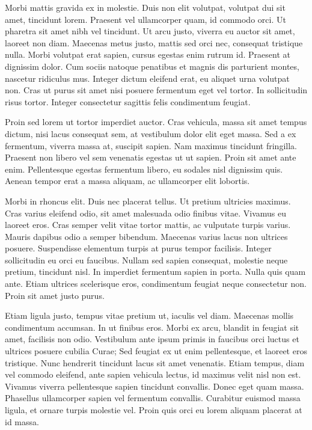 \documentclass[runningheads,a4paper]{llncs}
\begin{document}
Morbi mattis gravida ex in molestie. Duis non elit volutpat, volutpat dui sit amet, tincidunt lorem. Praesent vel ullamcorper quam, id commodo orci. Ut pharetra sit amet nibh vel tincidunt. Ut arcu justo, viverra eu auctor sit amet, laoreet non diam. Maecenas metus justo, mattis sed orci nec, consequat tristique nulla. Morbi volutpat erat sapien, cursus egestas enim rutrum id. Praesent at dignissim dolor. Cum sociis natoque penatibus et magnis dis parturient montes, nascetur ridiculus mus. Integer dictum eleifend erat, eu aliquet urna volutpat non. Cras ut purus sit amet nisi posuere fermentum eget vel tortor. In sollicitudin risus tortor. Integer consectetur sagittis felis condimentum feugiat.

Proin sed lorem ut tortor imperdiet auctor. Cras vehicula, massa sit amet tempus dictum, nisi lacus consequat sem, at vestibulum dolor elit eget massa. Sed a ex fermentum, viverra massa at, suscipit sapien. Nam maximus tincidunt fringilla. Praesent non libero vel sem venenatis egestas ut ut sapien. Proin sit amet ante enim. Pellentesque egestas fermentum libero, eu sodales nisl dignissim quis. Aenean tempor erat a massa aliquam, ac ullamcorper elit lobortis.

Morbi in rhoncus elit. Duis nec placerat tellus. Ut pretium ultricies maximus. Cras varius eleifend odio, sit amet malesuada odio finibus vitae. Vivamus eu laoreet eros. Cras semper velit vitae tortor mattis, ac vulputate turpis varius. Mauris dapibus odio a semper bibendum. Maecenas varius lacus non ultrices posuere. Suspendisse elementum turpis at purus tempor facilisis. Integer sollicitudin eu orci eu faucibus. Nullam sed sapien consequat, molestie neque pretium, tincidunt nisl. In imperdiet fermentum sapien in porta. Nulla quis quam ante. Etiam ultrices scelerisque eros, condimentum feugiat neque consectetur non. Proin sit amet justo purus.

Etiam ligula justo, tempus vitae pretium ut, iaculis vel diam. Maecenas mollis condimentum accumsan. In ut finibus eros. Morbi ex arcu, blandit in feugiat sit amet, facilisis non odio. Vestibulum ante ipsum primis in faucibus orci luctus et ultrices posuere cubilia Curae; Sed feugiat ex ut enim pellentesque, et laoreet eros tristique. Nunc hendrerit tincidunt lacus sit amet venenatis. Etiam tempus, diam vel commodo eleifend, ante sapien vehicula lectus, id maximus velit nisl non est. Vivamus viverra pellentesque sapien tincidunt convallis. Donec eget quam massa. Phasellus ullamcorper sapien vel fermentum convallis. Curabitur euismod massa ligula, et ornare turpis molestie vel. Proin quis orci eu lorem aliquam placerat at id massa.
\end{document}
